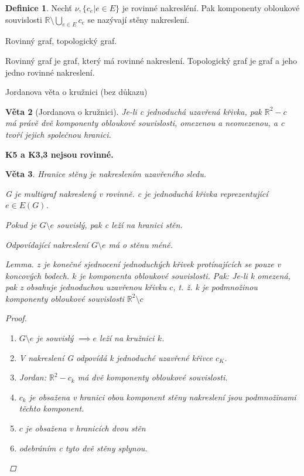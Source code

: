 \documentclass[10pt,a4paper]{article}
\theoremstyle{plain}
\newtheorem{veta}{Věta}
\theoremstyle{definition}
\newtheorem{definice}[veta]{Definice}
\begin{document}
\begin{definice}
Nechť $\nu, \{c_e | e \in E\}$ je rovinné nakresléní. Pak komponenty obloukové souvislosti $\mathbb{R} \setminus \bigcup_{e \in E} c_e$ se nazývají stěny nakreslení.
\end{definice}

Rovinný graf, topologický graf.

Rovinný graf je graf, který má rovinné nakreslení.
Topologický graf je graf a jeho jedno rovinné nakreslení.

Jordanova věta o kružnici (bez důkazu)

\begin{veta}[Jordanova o kružnici]
Je-li c jednoduchá uzavřená křivka, pak $\mathbb{R}^2 -c$ má právě dvě komponenty obloukové souvislosti, omezenou a neomezenou, a c tvoří jejich společnou hranici.
\end{veta}

\textbf{K5 a K3,3 nejsou rovinné.}




\begin{veta}
Hranice stěny je nakreslením uzavřeného sledu.

G je multigraf nakreslený v rovinně. c je jednoduchá křivka reprezentující $e \in E(G)$.

Pokud je $G \setminus e$ souvislý, pak c leží na hranici stěn.

Odpovídající nakreslení $G \setminus e$ má o stěnu méně.


Lemma.  $z$ je konečné sjednocení jednoduchých křivek protínajících se pouze v koncových bodech. $k$ je komponenta obloukové souvislosti. Pak: Je-li k omezená, pak z obsahuje jednoduchou uzavřenou křivku $c$, t. ž. k je podmnožinou komponenty obloukové souvislosti $\mathbb{R}^2 \setminus c$

\begin{proof}\begin{enumerate}
\item $G \setminus e$ je souvislý $\implies e$ leží na kružnici $k$.
\item V nakreslení G odpovídá k jednoduché uzavřené křivce $c_K$.
\item Jordan: $\mathbb{R}^2 - c_k$ má dvě komponenty obloukové souvislosti.
\item $c_k$ je obsažena v hranici obou komponent stěny nakreslení jsou podmnožinami těchto komponent.
\item $c$ je obsažena v hranicích dvou stěn
\item odebráním c tyto dvě stěny splynou.
\end{enumerate}

\end{proof}
\end{veta}
\end{document}
